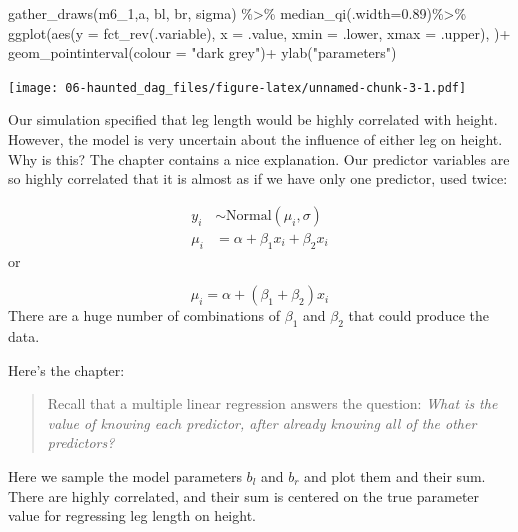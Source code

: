 \documentclass[
]{book}
\newenvironment{Shaded}{\begin{snugshade}}{\end{snugshade}}
\newcommand{\AttributeTok}[1]{\textcolor[rgb]{0.77,0.63,0.00}{#1}}
\newcommand{\FloatTok}[1]{\textcolor[rgb]{0.00,0.00,0.81}{#1}}
\newcommand{\FunctionTok}[1]{\textcolor[rgb]{0.00,0.00,0.00}{#1}}
\newcommand{\NormalTok}[1]{#1}
\newcommand{\SpecialCharTok}[1]{\textcolor[rgb]{0.00,0.00,0.00}{#1}}
\newcommand{\StringTok}[1]{\textcolor[rgb]{0.31,0.60,0.02}{#1}}
\begin{document}
\begin{Shaded}
\begin{Highlighting}[]
\FunctionTok{gather\_draws}\NormalTok{(m6\_1,a, bl, br, sigma) }\SpecialCharTok{\%\textgreater{}\%}
  \FunctionTok{median\_qi}\NormalTok{(}\AttributeTok{.width=}\FloatTok{0.89}\NormalTok{)}\SpecialCharTok{\%\textgreater{}\%}
\FunctionTok{ggplot}\NormalTok{(}\FunctionTok{aes}\NormalTok{(}\AttributeTok{y =} \FunctionTok{fct\_rev}\NormalTok{(.variable), }\AttributeTok{x =}\NormalTok{ .value, }\AttributeTok{xmin =}\NormalTok{ .lower, }\AttributeTok{xmax =}\NormalTok{ .upper), )}\SpecialCharTok{+}
  \FunctionTok{geom\_pointinterval}\NormalTok{(}\AttributeTok{colour =} \StringTok{"dark grey"}\NormalTok{)}\SpecialCharTok{+}
  \FunctionTok{ylab}\NormalTok{(}\StringTok{"parameters"}\NormalTok{)}
\end{Highlighting}
\end{Shaded}

\texttt{[image: 06-haunted\_dag\_files/figure-latex/unnamed-chunk-3-1.pdf]}

Our simulation specified that leg length would be highly correlated with height. However, the model is very uncertain about the influence of either leg on height. Why is this? The chapter contains a nice explanation. Our predictor variables are so highly correlated that it is almost as if we have only one predictor, used twice:

\[
\begin{aligned}
y_i &∼ \text{Normal}(\mu_i, \sigma) \\
\mu_i &= \alpha + \beta_1 x_i + \beta_2 x_i
\end{aligned}
\]
or

\[
\mu_i = \alpha + (\beta_1  + \beta_2 )x_i
\]
There are a huge number of combinations of \(\beta_1\) and \(\beta_2\) that could produce the data.

Here's the chapter:

\begin{quote}
Recall that a multiple linear regression answers the question: \emph{What is the value of knowing each predictor, after already knowing all of the other predictors?}
\end{quote}

Here we sample the model parameters \(b_l\) and \(b_r\) and plot them and their sum. There are highly correlated, and their sum is centered on the true parameter value for regressing leg length on height.
\end{document}
